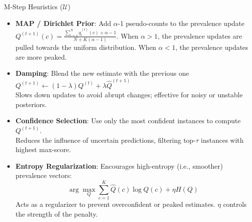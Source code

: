 \documentclass[aspectratio=169]{beamer}
\begin{document}
\begin{frame}{M‑Step Heuristics ($\mathcal{U}$)}
  \begin{itemize}
    \item \textbf{MAP / Dirichlet Prior}: Add $\alpha$-1 pseudo-counts to the prevalence update $Q^{(t+1)}(c) = \frac{\sum_{i=1}^N q_i^{(t)}(c) + \alpha - 1}{N + K(\alpha - 1)}$.
    When $\alpha>1$, the prevalence updates are pulled towards the uniform distribution. When $\alpha<1$, the prevalence updates are more peaked.\\
    \normalsize

    \item \textbf{Damping}: Blend the new estimate with the previous one $Q^{(t+1)} \gets (1-\lambda) Q^{(t)} + \lambda \hat{Q}^{(t+1)}$   \\
    
    \small Slows down updates to avoid abrupt changes; effective for noisy or unstable posteriors.
    \normalsize

    \item \textbf{Confidence Selection}: Use only the most confident instances to compute $Q^{(t+1)}$.\\
    \small Reduces the influence of uncertain predictions, filtering top-$\tau$ instances with highest max-score.
    \normalsize

    \item \textbf{Entropy Regularization}: Encourages high-entropy (i.e., smoother) prevalence vectors:\\
    \[
        \arg\max_Q \sum_{c=1}^K \hat{Q}(c) \log Q(c) + \eta H(Q)
    \]
    \small Acts as a regularizer to prevent overconfident or peaked estimates. $\eta$ controls the strength of the penalty.
  \end{itemize}
\end{frame}
\end{document}
